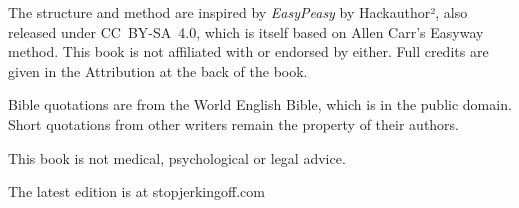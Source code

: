 {{  The structure and method are inspired by \textit{EasyPeasy} by Hackauthor², also released under CC~BY-SA~4.0, which is itself based on Allen Carr's Easyway method. This book is not affiliated with or endorsed by either. Full credits are given in the Attribution at the back of the book.

  Bible quotations are from the World English Bible, which is in the public domain. Short quotations from other writers remain the property of their authors.

  This book is not medical, psychological or legal advice.

  The latest edition is at stopjerkingoff.com\par}
  \clearpage
  \pagestyle{fancy}}

\let\sjooldtoc\tableofcontents
\renewcommand{\tableofcontents}{\cleardoublepage\markboth{}{}\sjooldtoc}

